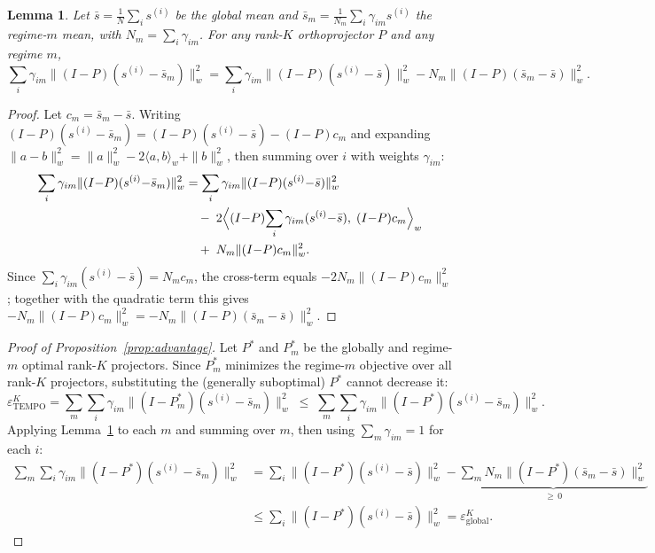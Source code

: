 \documentclass[preprint,10pt]{elsarticle}
\newtheorem{lemma}{Lemma}%
\begin{document}
\begin{lemma}\label{lem:mean}
Let $\bar{s}=\tfrac{1}{N}\sum_i s^{(i)}$ be the global mean and
$\bar{s}_m=\tfrac{1}{N_m}\sum_i\gamma_{im}s^{(i)}$ the regime-$m$ mean,
with $N_m=\sum_i\gamma_{im}$.
For any rank-$K$ orthoprojector $P$ and any regime $m$,
\[
  \sum_i \gamma_{im}\|(I{-}P)(s^{(i)}{-}\bar{s}_m)\|_w^2
  =
  \sum_i \gamma_{im}\|(I{-}P)(s^{(i)}{-}\bar{s})\|_w^2
  - N_m\|(I{-}P)(\bar{s}_m{-}\bar{s})\|_w^2.
\]
\end{lemma}
\begin{proof}
Let $c_m=\bar{s}_m-\bar{s}$.
Writing $(I{-}P)(s^{(i)}{-}\bar{s}_m)=(I{-}P)(s^{(i)}{-}\bar{s})-(I{-}P)c_m$
and expanding $\|a-b\|_w^2=\|a\|_w^2-2\langle a,b\rangle_w+\|b\|_w^2$,
then summing over $i$ with weights $\gamma_{im}$:
\begin{align*}
  \sum_i\gamma_{im}\|(I{-}P)(s^{(i)}{-}\bar{s}_m)\|_w^2
  &= \sum_i\gamma_{im}\|(I{-}P)(s^{(i)}{-}\bar{s})\|_w^2 \\
  &\quad -\;2\Bigl\langle(I{-}P)\!\sum_i\gamma_{im}(s^{(i)}{-}\bar{s}),\;(I{-}P)c_m\Bigr\rangle_w \\
  &\quad +\;N_m\|(I{-}P)c_m\|_w^2.
\end{align*}
Since $\sum_i\gamma_{im}(s^{(i)}{-}\bar{s})=N_mc_m$, the cross-term equals
$-2N_m\|(I{-}P)c_m\|_w^2$; together with the quadratic term this gives
$-N_m\|(I{-}P)c_m\|_w^2 = -N_m\|(I{-}P)(\bar{s}_m{-}\bar{s})\|_w^2$.
\end{proof}

\begin{proof}[Proof of Proposition~\ref{prop:advantage}]
Let $P^*$ and $P_m^*$ be the globally and regime-$m$ optimal rank-$K$ projectors.
Since $P_m^*$ minimizes the regime-$m$ objective over all rank-$K$ projectors,
substituting the (generally suboptimal) $P^*$ cannot decrease it:
\[
  \varepsilon_{\mathrm{TEMPO}}^K
  = \sum_m\sum_i\gamma_{im}\|(I{-}P_m^*)(s^{(i)}{-}\bar{s}_m)\|_w^2
  \;\leq\;
  \sum_m\sum_i\gamma_{im}\|(I{-}P^*)(s^{(i)}{-}\bar{s}_m)\|_w^2.
\]
Applying Lemma~\ref{lem:mean} to each $m$ and summing over $m$,
then using $\sum_m\gamma_{im}=1$ for each $i$:
\begin{align*}
  \sum_m\sum_i\gamma_{im}\|(I{-}P^*)(s^{(i)}{-}\bar{s}_m)\|_w^2
  &= \sum_i\|(I{-}P^*)(s^{(i)}{-}\bar{s})\|_w^2
    - \underbrace{\sum_m N_m\|(I{-}P^*)(\bar{s}_m{-}\bar{s})\|_w^2}_{\geq\,0}\\
  &\leq \sum_i\|(I{-}P^*)(s^{(i)}{-}\bar{s})\|_w^2
    = \varepsilon_{\mathrm{global}}^K.
\end{align*}
\end{proof}
\end{document}
